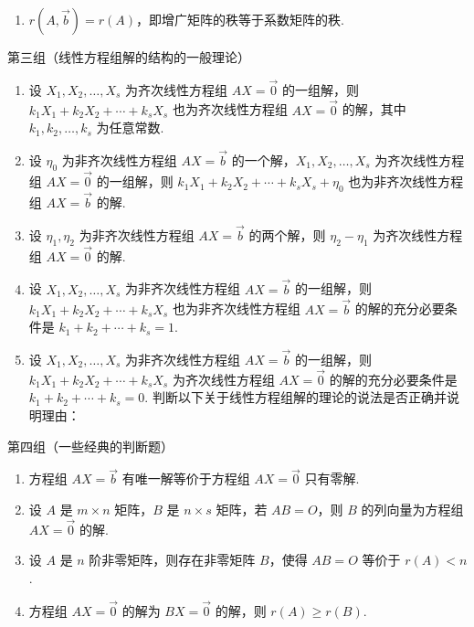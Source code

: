 \begin{exercise}
\begin{exgroup}
\begin{enumerate}[resume*]
\begin{enumerate}
                      \item $r(A,\vec{b})=r(A)$，即增广矩阵的秩等于系数矩阵的秩.
                  \end{enumerate}
        \end{enumerate}

        第三组（线性方程组解的结构的一般理论）
        \begin{enumerate}[resume*]
            \item 设 $X_1,X_2,\ldots,X_s$ 为齐次线性方程组 $AX=\vec{0}$ 的一组解，则 $k_1X_1+k_2X_2+\cdots+k_sX_s$ 也为齐次线性方程组 $AX=\vec{0}$ 的解，其中 $k_1,k_2,\ldots,k_s$ 为任意常数.

            \item 设 $\eta_0$ 为非齐次线性方程组 $AX=\vec{b}$ 的一个解，$X_1,X_2,\ldots,X_s$ 为齐次线性方程组 $AX=\vec{0}$ 的一组解，则 $k_1X_1+k_2X_2+\cdots+k_sX_s+\eta_0$ 也为非齐次线性方程组 $AX=\vec{b}$ 的解.

            \item 设 $\eta_1,\eta_2$ 为非齐次线性方程组 $AX=\vec{b}$ 的两个解，则 $\eta_2-\eta_1$ 为齐次线性方程组 $AX=\vec{0}$ 的解.

            \item 设 $X_1,X_2,\ldots,X_s$ 为非齐次线性方程组 $AX=\vec{b}$ 的一组解，则 $k_1X_1+k_2X_2+\cdots+k_sX_s$ 也为非齐次线性方程组 $AX=\vec{b}$ 的解的充分必要条件是 $k_1+k_2+\cdots+k_s=1$.

            \item 设 $X_1,X_2,\ldots,X_s$ 为非齐次线性方程组 $AX=\vec{b}$ 的一组解，则 $k_1X_1+k_2X_2+\cdots+k_sX_s$ 为齐次线性方程组 $AX=\vec{0}$ 的解的充分必要条件是 $k_1+k_2+\cdots+k_s=0$. 判断以下关于线性方程组解的理论的说法是否正确并说明理由：
        \end{enumerate}

        第四组（一些经典的判断题）
        \begin{enumerate}[resume*]
            \item 方程组 $AX=\vec{b}$ 有唯一解等价于方程组 $AX=\vec{0}$ 只有零解.

            \item 设 $A$ 是 $m \times n$ 矩阵，$B$ 是 $n \times s$ 矩阵，若 $AB=O$，则 $B$ 的列向量为方程组 $AX=\vec{0}$ 的解.

            \item 设 $A$ 是 $n$ 阶非零矩阵，则存在非零矩阵 $B$，使得 $AB=O$ 等价于 $r(A)<n$.

            \item 方程组 $AX=\vec{0}$ 的解为 $BX=\vec{0}$ 的解，则 $r(A) \geqslant r(B)$.


\end{enumerate}
\end{exgroup}
\end{exercise}
